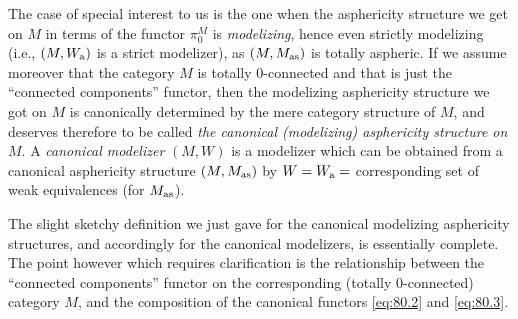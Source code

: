 The case of special interest to us is the one when the asphericity
structure we get on $M$ in terms of the functor $\pi_0^M$ is
\emph{modelizing}, hence even strictly modelizing (i.e., $(M,W_{\mathrm{a}})$
is a strict modelizer), as $(M,M_{\mathrm{as}})$ is totally aspheric. If we
assume moreover that the category $M$ is totally $0$-connected and
that \piz{} is just the ``connected components'' functor, then the
modelizing asphericity structure we got on $M$ is canonically
determined by the mere category structure of $M$, and deserves
therefore to be called \emph{the canonical \textup(modelizing\textup)
  asphericity structure on $M$}. A \emph{canonical modelizer} $(M,W)$
is a modelizer which can be obtained from a canonical asphericity
structure $(M,M_{\mathrm{as}})$ by $W=W_{\mathrm{a}}=$ corresponding set of weak
equivalences (for $M_{\mathrm{as}}$).

\begin{remark}
  The slight sketchy definition we just gave for the canonical
  modelizing asphericity structures, and accordingly for the canonical
  modelizers, is essentially complete. The point however which
  requires clarification is the relationship between the ``connected
  components'' functor on the corresponding (totally $0$-connected)
  category $M$, and the composition of the canonical functors
  \eqref{eq:80.2} and \eqref{eq:80.3}.
\end{remark}

\bigbreak

\noindent\hfill{}\par

